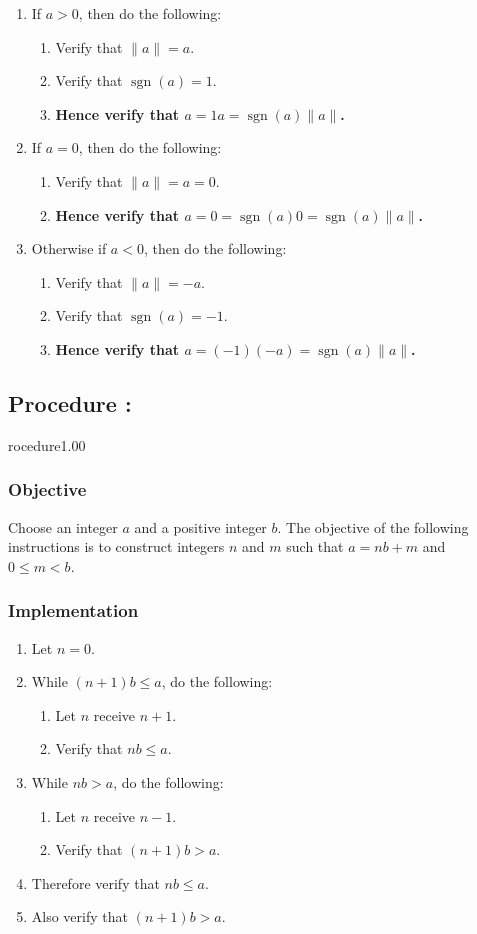 \documentclass{article}
\DeclareMathOperator{\sgn}{sgn}
\newcounter{procedure}[part]
\newcommand{\procedure}[1]{\subsection*{Procedure \thepart:\theprocedure}\label{sec:procedure #1}\global\expandafter\edef\csname procedure#1\endcsname{\thepart:\theprocedure}\addtocounter{procedure}{1}}
\newcommand{\objective}{\subsubsection*{Objective}}
\newcommand{\implementation}{\subsubsection*{Implementation}}
\begin{document}
\begin{multicols}{2}
\begin{enumerate}
					\item If $a>0$, then do the following:
					\begin{enumerate}
						\item Verify that $\lVert a\rVert=a$.
						\item Verify that $\sgn(a)=1$.
						\item \textbf{Hence verify that $a=1a=\sgn(a)\lVert a\rVert$.}
					\end{enumerate}
					\item If $a=0$, then do the following:
					\begin{enumerate}
						\item Verify that $\lVert a\rVert=a=0$.
						\item \textbf{Hence verify that $a=0=\sgn(a)0=\sgn(a)\lVert a\rVert$.}
					\end{enumerate}
					\item Otherwise if $a<0$, then do the following:
					\begin{enumerate}
						\item Verify that $\lVert a\rVert=-a$.
						\item Verify that $\sgn(a)=-1$.
						\item \textbf{Hence verify that $a=(-1)(-a)=\sgn(a)\lVert a\rVert$.}
					\end{enumerate}
				\end{enumerate}
		\procedure{1.00}
			\objective
				Choose an integer $a$ and a positive integer $b$. The objective of the following instructions is to construct integers $n$ and $m$ such that $a=nb+m$ and $0\le m<b$.
			\implementation
				\begin{enumerate}
					\item Let $n=0$.
					\item While $(n+1)b\le a$, do the following:
					\begin{enumerate}
						\item Let $n$ receive $n+1$.
						\item Verify that $nb\le a$.
					\end{enumerate}
					\item While $nb>a$, do the following:
					\begin{enumerate}
						\item Let $n$ receive $n-1$.
						\item Verify that $(n+1)b>a$.
					\end{enumerate}
					\item Therefore verify that $nb\le a$.
					\item Also verify that $(n+1)b>a$.

\end{enumerate}
\end{multicols}
\end{document}
